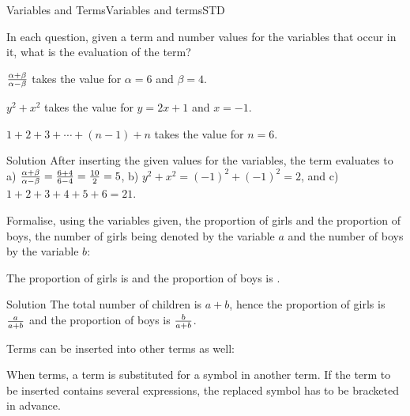 \begin{MXContent}{Variables and Terms}{Variables and terms}{STD}
\begin{MExercise}
In each question, given a term and number values for the variables that occur in it, what is the evaluation of the term?
\begin{MExerciseItems}
\item{$\tfrac{\alpha+\beta}{\alpha-\beta}$ takes the value  for $\alpha=6$ and $\beta=4$.}
\item{$y^2+x^2$ takes the value  for $y=2x+1$ and $x=-1$.}
\item{$1+2+3+\cdots+(n-1)+n$ takes the value  for $n=6$.}
\end{MExerciseItems}
\begin{MHint}{Solution}
After inserting the given values for the variables, the term evaluates to a) $\tfrac{\alpha+\beta}{\alpha-\beta}=\tfrac{6+4}{6-4}=\tfrac{10}{2}=5$,
b) $y^2+x^2=(-1)^2+(-1)^2=2$, and c) $1+2+3+4+5+6=21$.
\end{MHint}
\end{MExercise}

\begin{MExercise}
Formalise, using the variables given, the proportion of girls and the proportion of boys, 
the number of girls being denoted by the variable $a$ and the number of boys by the variable $b$:


The proportion of girls is  and
the proportion of boys is .\\

\begin{MHint}{Solution}
The total number of children is $a+b$, hence the proportion of girls is $\tfrac{a}{a+b}$
and the proportion of boys is $\tfrac{b}{a+b}$.
\end{MHint}
\end{MExercise}


Terms can be inserted into other terms as well:

\begin{MInfo}
When  terms, a term is substituted for a symbol in another term. If the term to be inserted contains several expressions, the
replaced symbol has to be bracketed in advance.
\end{MInfo}


\end{MXContent}
